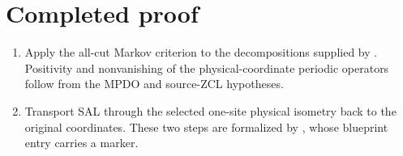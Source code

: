\documentclass{article}
\begin{document}
\section{Completed proof}

\begin{enumerate}
    \item Apply the all-cut Markov criterion to the decompositions supplied by
    .
    Positivity and nonvanishing of the physical-coordinate periodic operators
    follow from the MPDO and source-ZCL hypotheses.

    \item Transport SAL through the selected one-site physical isometry back
    to the original coordinates. These two steps are formalized by
    , whose
    blueprint entry carries a \texttt{\string\leanok} marker.
\end{enumerate}



\end{document}
